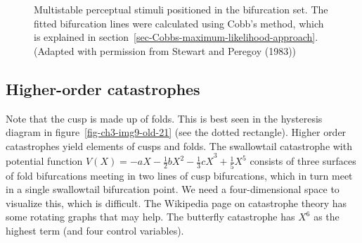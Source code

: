 \documentclass[
  a4paper,
  DIV=11,
  numbers=noendperiod,
  oneside]{scrreprt}
\begin{document}
\begin{figure}


\caption{\label{fig-ch3-img14-old-26}Multistable perceptual stimuli
positioned in the bifurcation set. The fitted bifurcation lines were
calculated using Cobb's method, which is explained in
section~\ref{sec-Cobbs-maximum-likelihood-approach}. (Adapted with
permission from Stewart and Peregoy (1983))}

\end{figure}%

\subsection{Higher-order
catastrophes}\label{sec-Higher-order-catastrophes}

Note that the cusp is made up of folds. This is best seen in the
hysteresis diagram in figure~\ref{fig-ch3-img9-old-21} (see the dotted
rectangle). Higher order catastrophes yield elements of cusps and folds.
The swallowtail catastrophe with potential function
\(V(X) = {- aX - \frac{1}{2}bX^{2} - \frac{1}{3}cX}^{3} + \frac{1}{5}X^{5}\)
consists of three surfaces of fold bifurcations meeting in two lines of
cusp bifurcations, which in turn meet in a single swallowtail
bifurcation point. We need a four-dimensional space to visualize this,
which is difficult. The Wikipedia page on catastrophe theory has some
rotating graphs that may help. The butterfly catastrophe has \(X^{6}\)
as the highest term (and four control variables).
\end{document}
